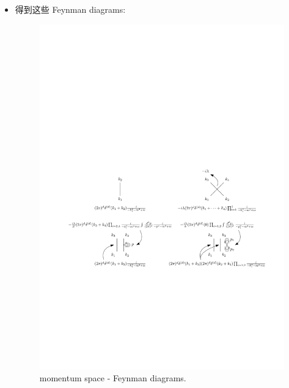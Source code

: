 \begin{itemize}
	\item 得到这些 Feynman diagrams:
	
	\begin{figure}[H]
		\centering
		\includegraphics[scale=1]{figures/collision between particles - Feynman diagrams (in momentum space).pdf}
		\caption{momentum space - Feynman diagrams.}
		\label{figure Feynman diagrams.3}
	\end{figure}
	

\end{itemize}

